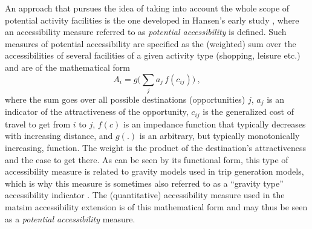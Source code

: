 An approach that pursues the idea of taking into account the whole scope of potential activity facilities is the one 
developed in Hansen's early study \citep{Hansen1959HowAccessibilityShapesLandUse}, where an accessibility 
measure referred to as \emph{potential accessibility} is defined. Such measures of potential accessibility are 
specified as the (weighted) sum over the 
accessibilities of several facilities of a given activity type (\eg shopping, leisure etc.) and are of the mathematical form
\begin{equation}
	A_i = g\Big( \sum_j a_j \, f(c_{ij}) \Big) \ ,
	\label{eq:accessibility:basic}
\end{equation}
where the sum goes over all possible destinations (opportunities) $j$, $a_j$ is an indicator of the attractiveness of 
the opportunity, $c_{ij}$ is the generalized cost of travel to get from $i$ to $j$, $f(c)$ is an impedance function 
that typically decreases with increasing distance, and $g(.)$ is an arbitrary, but typically monotonically increasing, 
function. 
The weight is the product of the destination's attractiveness and the ease to get there. As can be seen by its 
functional form, this type of accessibility measure is related to gravity models used in trip generation models, which 
is why this measure is sometimes also referred to as a ``gravity type'' accessibility indicator 
\citep{MorrisEtAl1978AccessibilityIndicators}. The (quantitative) accessibility measure used in the \gls{matsim} 
accessibility extension is of this mathematical form and may thus be seen as a \emph{potential accessibility} measure.



